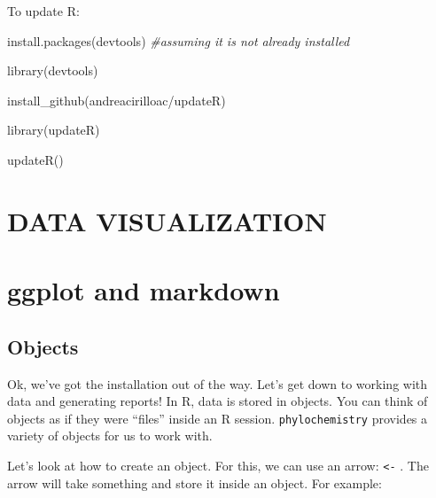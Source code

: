 \documentclass[
]{krantz}
\newenvironment{Shaded}{\begin{snugshade}}{\end{snugshade}}
\newcommand{\CommentTok}[1]{\textcolor[rgb]{0.56,0.35,0.01}{\textit{#1}}}
\newcommand{\FunctionTok}[1]{\textcolor[rgb]{0.00,0.00,0.00}{#1}}
\newcommand{\NormalTok}[1]{#1}
\newcommand{\StringTok}[1]{\textcolor[rgb]{0.31,0.60,0.02}{#1}}
\begin{document}
To update R:

\begin{Shaded}
\begin{Highlighting}[]

\FunctionTok{install.packages}\NormalTok{(}\StringTok{\textquotesingle{}devtools\textquotesingle{}}\NormalTok{) }\CommentTok{\#assuming it is not already installed}

\FunctionTok{library}\NormalTok{(devtools)}

\FunctionTok{install\_github}\NormalTok{(}\StringTok{\textquotesingle{}andreacirilloac/updateR\textquotesingle{}}\NormalTok{)}

\FunctionTok{library}\NormalTok{(updateR)}

\FunctionTok{updateR}\NormalTok{()}
\end{Highlighting}
\end{Shaded}

\hypertarget{section-2}{%
\section*{}\label{section-2}}

\hypertarget{data-visualization}{%
\section*{DATA VISUALIZATION}\label{data-visualization}}

\hypertarget{R_Markdown}{%
\section{ggplot and markdown}\label{R_Markdown}}

\hypertarget{objects}{%
\subsection{Objects}\label{objects}}

Ok, we've got the installation out of the way. Let's get down to working with data and generating reports! In R, data is stored in objects. You can think of objects as if they were ``files'' inside an R session. \texttt{phylochemistry} provides a variety of objects for us to work with.

Let's look at how to create an object. For this, we can use an arrow: \texttt{\textless{}-} . The arrow will take something and store it inside an object. For example:
\end{document}
